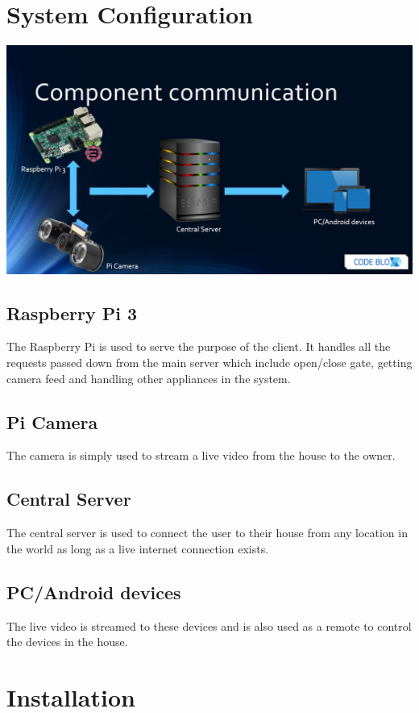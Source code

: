 \documentclass[a4paper,12pt]{article}
\begin{document}
	\section{System Configuration}
		
		\includegraphics[width=1\textwidth]{./Pictures/CodeBlox.jpg}\\[1.5cm] 
	
		\subsection{Raspberry Pi 3}
		The Raspberry Pi is used to serve the purpose of the client. It handles all the requests passed down from the main server which include open/close gate, getting camera feed and handling other appliances in the system.
		
		\subsection{Pi Camera}
		The camera is simply used to stream a live video from the house to the owner.
		
		\subsection{Central Server}
		The central server is used to connect the user to their house from any location in the world as long as a live internet connection exists.
		
		\subsection{PC/Android devices}
		The live video is streamed to these devices and is also used as a remote to control the devices in the house.
		
	\section{Installation}
	
\end{document}
